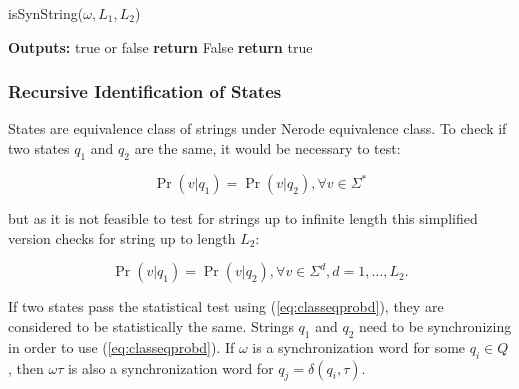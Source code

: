 {\begin{algorithm}[b]
\caption{isSynString($\omega, L_1, L_2$)\label{alg:issynstring}}
	\begin{algorithmic}[1]
	\State \textbf{Outputs:} true or false
						\State \textbf{return} False
					\EndIf
				\EndFor
			\EndFor
		\EndFor
	\EndFor
	\State \textbf{return} true
	\end{algorithmic}
\end{algorithm}

\subsubsection{Recursive Identification of States}

States are equivalence class of strings under Nerode equivalence class. To check if two states $q_1$ and $q_2$ are the same, it would be necessary to test:

\begin{equation}\label{eq:classeqprob}
\Pr(v|q_1) = \Pr(v|q_2), \forall v \in \Sigma^*
\end{equation}

\noindent but as it is not feasible to test for strings up to infinite length this simplified version checks for string up to length $L_2$:

%
%

\begin{equation}\label{eq:classeqprobd}
\Pr(v|q_1) = \Pr(v|q_2), \forall v \in \Sigma^d, d = 1,\ldots,L_2.
\end{equation}

If two states pass the statistical test using (\ref{eq:classeqprobd}), they are considered to be statistically the same. Strings $q_1$ and $q_2$ need to be synchronizing in order to use (\ref{eq:classeqprobd}). If $\omega$ is a synchronization word for some $q_i \in Q$, then $\omega\tau$ is also a synchronization word for $q_j = \delta(q_i,\tau)$.

}
